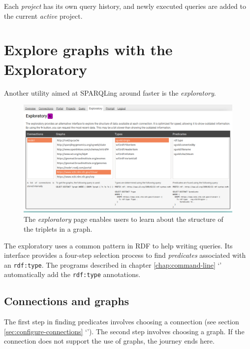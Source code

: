   Each \emph{project} has its own query history, and newly executed queries are
  added to the current \emph{active} project.

\section{Explore graphs with the Exploratory}

  Another utility aimed at SPARQLing around faster is the \emph{exploratory}.

  \begin{figure}[H]
    \begin{center}
      \includegraphics[width=1.0\textwidth]{figures/web-exploratory.png}
    \end{center}
    \caption{The \emph{exploratory} page enables users to learn about the
      structure of the triplets in a graph.}
    \label{fig:web-exploratory}
  \end{figure}

  The exploratory uses a common pattern in RDF to help writing queries.  Its
  interface provides a four-step selection process to find \emph{predicates}
  associated with an \texttt{rdf:type}.  The programs described in chapter
  \ref{chap:command-line} {\color{LinkGray}`'}
  automatically add the \texttt{rdf:type} annotations.

\subsection{Connections and graphs}

  The first step in finding predicates involves choosing a connection
  (see section \ref{sec:configure-connections} {\color{LinkGray}%
    `'}).  The second step involves
  choosing a graph.  If the connection does not support the use of graphs,
  the journey ends here.

